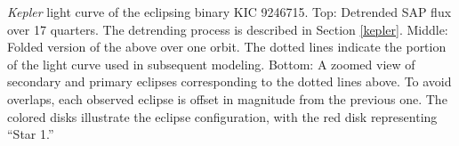 \label{fig:keplerfig} \emph{Kepler} light curve of the eclipsing binary KIC 9246715. Top: Detrended SAP flux over 17 quarters. The detrending process is described in Section \ref{kepler}. Middle: Folded version of the above over one orbit. The dotted lines indicate the portion of the light curve used in subsequent modeling. Bottom: A zoomed view of secondary and primary eclipses corresponding to the dotted lines above. To avoid overlaps, each observed eclipse is offset in magnitude from the previous one. The colored disks illustrate the eclipse configuration, with the red disk representing ``Star 1.''

